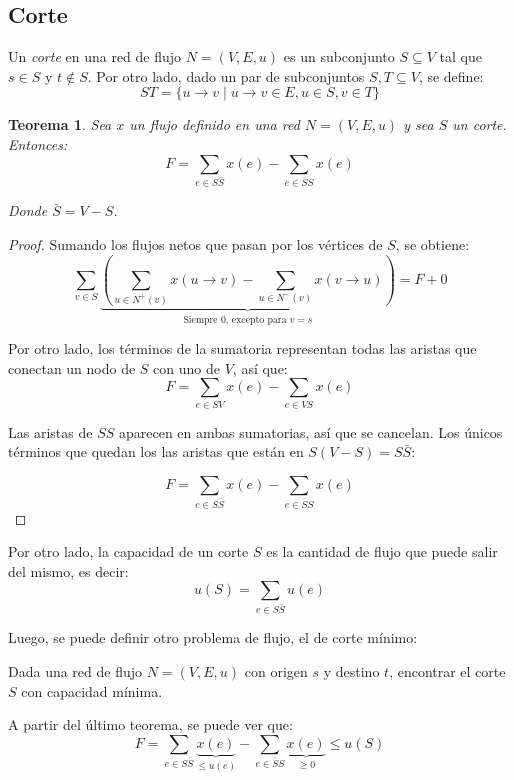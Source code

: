 \documentclass[a4paper]{report}
\newtheorem*{theorem*}{Teorema}
\begin{document}
\subsection{Corte}

Un \textit{corte} en una red de flujo $N = (V, E, u)$ es un subconjunto $S \subseteq V$ tal que $s \in S$ y $t \notin S$. Por otro lado, dado un par de subconjuntos $S, T \subseteq V$, se define:
$$ST = \{u \rightarrow v \mid u \rightarrow v \in E, u \in S, v \in T\}$$

\begin{theorem*}
    \leavevmode

    Sea $x$ un flujo definido en una red $N = (V, E, u)$ y sea $S$ un corte. Entonces:
    $$F = \sum_{e \in S\bar{S}} x(e) - \sum_{e \in \bar{S}S} x(e)$$

    Donde $\bar{S} = V - S$.
\end{theorem*}
\begin{proof}
    Sumando los flujos netos que pasan por los vértices de $S$, se obtiene:
    $$\sum_{v \in S}\underbrace{\left(\sum_{u \in N^+(v)} x(u \rightarrow v) - \sum_{u \in N^-(v)} x(v \rightarrow u)\right)}_{\text{Siempre $0$, excepto para $v = s$}} = F + 0$$

    Por otro lado, los términos de la sumatoria representan todas las aristas que conectan un nodo de $S$ con uno de $V$, así que:
    $$F = \sum_{e \in SV} x(e) - \sum_{e \in VS} x(e)$$

    Las aristas de $SS$ aparecen en ambas sumatorias, así que se cancelan. Los únicos términos que quedan los las aristas que están en $S(V - S) = S\bar{S}$:

    $$F = \sum_{e \in S\bar{S}} x(e) - \sum_{e \in \bar{S}S} x(e)$$

\end{proof}

Por otro lado, la capacidad de un corte $S$ es la cantidad de flujo que puede salir del mismo, es decir:
$$u(S) = \sum_{e \in S\bar{S}} u(e)$$

Luego, se puede definir otro problema de flujo, el de corte mínimo:

\begin{problema}
    Dada una red de flujo $N = (V, E, u)$ con origen $s$ y destino $t$, encontrar el corte $S$ con capacidad mínima.
\end{problema}

A partir del último teorema, se puede ver que:
$$F = \sum_{e \in S\bar{S}} \underbrace{x(e)}_{\leq u(e)} - \sum_{e \in \bar{S}S} \underbrace{x(e)}_{\geq 0} \leq u(S)$$
\end{document}
